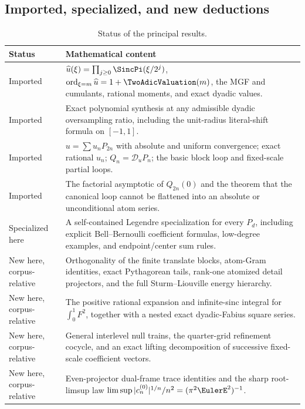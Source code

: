 \documentclass[11pt,oneside]{article}
\numberwithin{equation}{section}
\theoremstyle{definition}
\theoremstyle{remark}
\newcommand{\Dscr}{\mathscr D_u}
\DeclareMathOperator{\ord}{ord}
\begin{document}
\subsection{Imported, specialized, and new deductions}

\begin{table}[H]
\centering
\small
\begin{tabularx}{\textwidth}{@{}p{}X@{}}
\toprule
Status & Mathematical content\\
\midrule
Imported &
$\widehat u(\xi)=\prod_{j\ge0}\SincPi(\xi/2^j)$,
$\ord_{\xi=m}\widehat u=1+\TwoAdicValuation(m)$, the MGF and cumulants, rational moments,
and exact dyadic values.\\
Imported &
Exact polynomial synthesis at any admissible dyadic oversampling ratio,
including the unit-radius literal-shift formula on $[-1,1]$.\\
Imported &
$u=\sum u_nP_{2n}$ with absolute and uniform convergence; exact rational
$u_n$; $Q_n=\Dscr P_n$; the basic block loop and fixed-scale partial loops.\\
Imported &
The factorial asymptotic of $Q_{2n}(0)$ and the theorem that the canonical loop
cannot be flattened into an absolute or unconditional atom series.\\
Specialized here &
A self-contained Legendre specialization for every $P_d$, including explicit
Bell--Bernoulli coefficient formulas, low-degree examples, and endpoint/center
sum rules.\\
New here, corpus-relative &
Orthogonality of the finite translate blocks, atom-Gram identities, exact
Pythagorean tails, rank-one atomized detail projectors, and the full
Sturm--Liouville energy hierarchy.\\
New here, corpus-relative &
The positive rational expansion and infinite-sinc integral for
$\int_0^1F^2$, together with a nested exact dyadic-Fabius square series.\\
New here, corpus-relative &
General interlevel null trains, the quarter-grid refinement cocycle, and an
exact lifting decomposition of successive fixed-scale coefficient vectors.\\
New here, corpus-relative &
Even-projector dual-frame trace identities and the sharp root-limsup law
$\limsup |c_n^{(0)}|^{1/n}/n^2=(\pi^2\EulerE^2)^{-1}$.\\
\bottomrule
\end{tabularx}
\caption{Status of the principal results.}
\label{tab:status}
\end{table}
\end{document}
